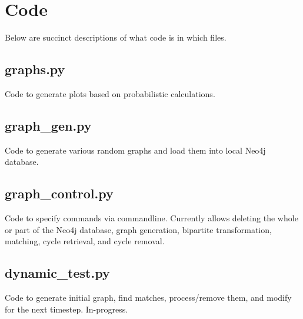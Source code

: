 \documentclass[main.tex]{subfiles}
\begin{document}
\section{Code}

Below are succinct descriptions of what code is in which files.

\subsection{graphs.py}
Code to generate plots based on probabilistic calculations.

\subsection{graph\_gen.py}
Code to generate various random graphs and load them into local Neo4j database.

\subsection{graph\_control.py}
Code to specify commands via commandline. Currently allows deleting the whole or part of the Neo4j database, graph generation, bipartite transformation, matching, cycle retrieval, and cycle removal.

\subsection{dynamic\_test.py}
Code to generate initial graph, find matches, process/remove them, and modify for the next timestep.
In-progress.
\end{document}

